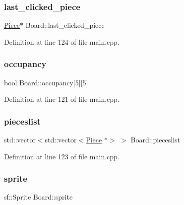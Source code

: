 \mbox{\label{class_board_ad109cf70d4d3d8cb6ea505cdfe3a3bb6}} 
\subsubsection{\texorpdfstring{last\_clicked\_piece}{last\_clicked\_piece}}
{\footnotesize\ttfamily \mbox{\hyperlink{class_piece}{Piece}}$\ast$ Board\+::last\+\_\+clicked\+\_\+piece}



Definition at line 124 of file main.\+cpp.

\mbox{\label{class_board_a60287104e28c94cbc118266bd30cf407}} 
\subsubsection{\texorpdfstring{occupancy}{occupancy}}
{\footnotesize\ttfamily bool Board\+::occupancy\mbox{[}5\mbox{]}\mbox{[}5\mbox{]}}



Definition at line 121 of file main.\+cpp.

\mbox{\label{class_board_a1f0cd782b34c4facdb9210e5c3982cba}} 
\subsubsection{\texorpdfstring{pieceslist}{pieceslist}}
{\footnotesize\ttfamily std\+::vector$<$std\+::vector$<$\mbox{\hyperlink{class_piece}{Piece}} $\ast$$>$ $>$ Board\+::pieceslist}



Definition at line 123 of file main.\+cpp.

\mbox{\label{class_board_a5f44ad90ccf01fa76ed8095b39f23b9d}} 
\subsubsection{\texorpdfstring{sprite}{sprite}}
{\footnotesize\ttfamily sf\+::\+Sprite Board\+::sprite}



